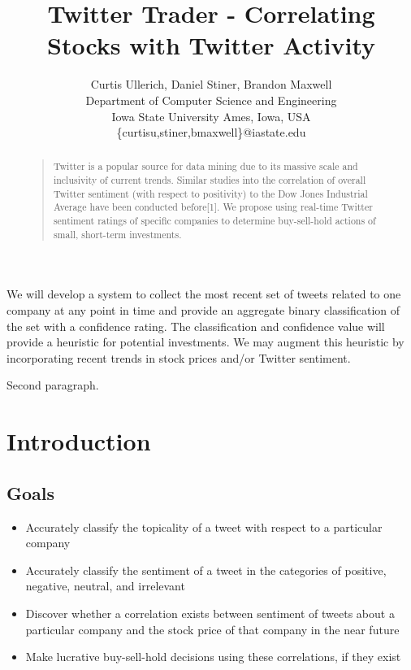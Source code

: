 \documentclass[letterpaper]{article}
\begin{document}
\title{Twitter Trader - Correlating \\ Stocks with Twitter Activity}
\author{
Curtis Ullerich, Daniel Stiner, Brandon Maxwell\\
Department of Computer Science and Engineering\\
Iowa State University
Ames, Iowa, USA\\
\{curtisu,stiner,bmaxwell\}@iastate.edu\\
}
\maketitle
\begin{abstract}
\begin{quote}
Twitter is a popular source for data mining due to its massive scale and inclusivity of current trends. Similar studies into the correlation of overall Twitter sentiment (with respect to positivity) to the Dow Jones Industrial Average have been conducted before[1]. We propose using real-time Twitter sentiment ratings of specific companies to determine buy-sell-hold actions of small, short-term investments.
\end{quote}
\end{abstract}

\noindent We will develop a system to collect the most recent set of tweets related to one company at any point in time and provide an aggregate binary classification of the set with a confidence rating. The classification and confidence value will provide a heuristic for potential investments. We may augment this heuristic by incorporating recent trends in stock prices and/or Twitter sentiment.

Second paragraph.

\section{Introduction}

\subsection{Goals}

\begin{itemize}

\item Accurately classify the topicality of a tweet with respect to a particular company
\item Accurately classify the sentiment of a tweet in the categories of positive, negative, neutral, and irrelevant
\item Discover whether a correlation exists between sentiment of tweets about a particular company and the stock price of that company in the near future
\item Make lucrative buy-sell-hold decisions using these correlations, if they exist

\end{itemize}
\end{document}
